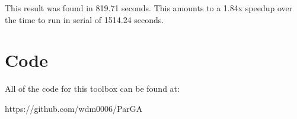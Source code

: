 \documentclass[conference]{IEEEtran}
\begin{document}
This result was found in 819.71 seconds.  This amounts to a 1.84x speedup over the time to run in serial of 1514.24 seconds. 

\section{Code}

All of the code for this toolbox can be found at:

https://github.com/wdm0006/ParGA
% 
%
\end{document}
